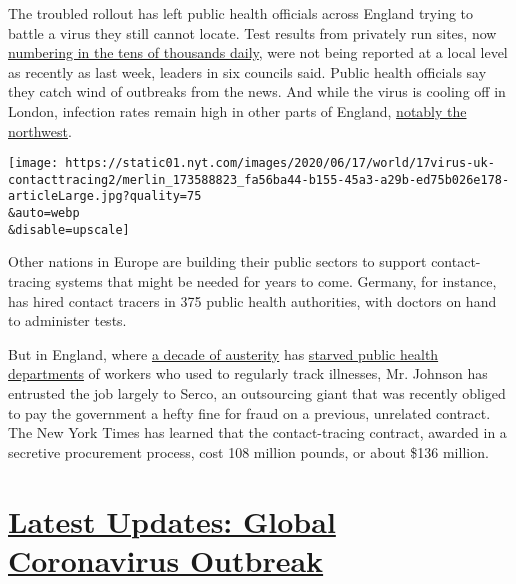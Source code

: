 The troubled rollout has left public health officials across England
trying to battle a virus they still cannot locate. Test results from
privately run sites, now
\href{https://www.gov.uk/guidance/coronavirus-covid-19-information-for-the-public}{numbering
in the tens of thousands daily}, were not being reported at a local
level as recently as last week, leaders in six councils said. Public
health officials say they catch wind of outbreaks from the news. And
while the virus is cooling off in London, infection rates remain high in
other parts of England,
\href{https://www.theguardian.com/world/2020/jun/07/what-is-coronavirus-r-number-and-is-it-rising-in-uk}{notably
the northwest}.

\texttt{[image: https://static01.nyt.com/images/2020/06/17/world/17virus-uk-contacttracing2/merlin\_173588823\_fa56ba44-b155-45a3-a29b-ed75b026e178-articleLarge.jpg?quality=75\\\&auto=webp\\\&disable=upscale]}

Other nations in Europe are building their public sectors to support
contact-tracing systems that might be needed for years to come. Germany,
for instance, has hired contact tracers in 375 public health
authorities, with doctors on hand to administer tests.

But in England, where
\href{https://www.nytimes.com/2019/02/24/world/europe/britain-austerity-may-budget.html}{a
decade of austerity} has
\href{https://www.local.gov.uk/sites/default/files/documents/LGA\%20briefing\%20-\%20health\%20and\%20local\%20public\%20health\%20cuts\%20-\%20HoC\%20140519\%20WEB.pdf}{starved
public health departments} of workers who used to regularly track
illnesses, Mr. Johnson has entrusted the job largely to Serco, an
outsourcing giant that was recently obliged to pay the government a
hefty fine for fraud on a previous, unrelated contract. The New York
Times has learned that the contact-tracing contract, awarded in a
secretive procurement process, cost 108 million pounds, or about \$136
million.

\hypertarget{latest-updates-global-coronavirus-outbreak}{%
\section{\texorpdfstring{\href{https://www.nytimes.com/2020/08/01/world/coronavirus-covid-19.html?action=click\&pgtype=Article\&state=default\&region=MAIN_CONTENT_1\&context=storylines_live_updates}{Latest
Updates: Global Coronavirus
Outbreak}}{Latest Updates: Global Coronavirus Outbreak}}\label{latest-updates-global-coronavirus-outbreak}}


